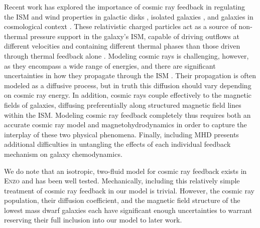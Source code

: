 \documentclass[twocolumn]{aastex61}
\begin{document}
Recent work has explored the importance of cosmic ray feedback in regulating the ISM and wind properties in galactic disks \citep{Hanasz2013,GirichidisCR,Simpson2016,Farber2017}, isolated galaxies \citep{SalemBryanCorlies,Salem2015,Pakmor2016,Ruszkowski2017}, and galaxies in cosmological context \citep{SalemBryanHummels}. These relativistic charged particles act as a source of non-thermal pressure support in the galaxy's ISM, capable of driving outflows at different velocities and containing different thermal phases than those driven through thermal feedback alone \citep{SalemBryanCorlies}. Modeling cosmic rays is challenging, however, as they encompass a wide range of energies, and there are significant uncertainties in how they propagate through the ISM \citep[e.g.][]{Wiener2017}. Their propagation is often modeled as a diffusive process, but in truth this diffusion should vary depending on cosmic ray energy. In addition, cosmic rays couple effectively to the magnetic fields of galaxies, diffusing preferentially along structured magnetic field lines within the ISM. Modeling cosmic ray feedback completely thus requires both an accurate cosmic ray model and magnetohydrodynamics in order to capture the interplay of these two physical phenomena. Finally, including MHD presents additional difficulties in untangling the effects of each individual feedback mechanism on galaxy chemodynamics.

We do note that an isotropic, two-fluid model for cosmic ray feedback exists in  \textsc{Enzo} \citep{SalemBryan2014,Salem2015} and has been well tested. Mechanically, including this relatively simple treatment of 
cosmic ray feedback in our model is trivial. However, the cosmic ray population, their diffusion coefficient, and the magnetic field structure of the lowest mass dwarf galaxies each have significant enough uncertainties to warrant reserving their full inclusion into our model to later work.



\end{document}
